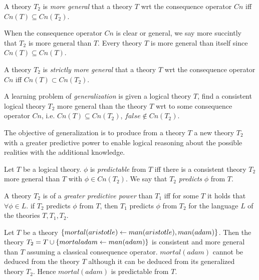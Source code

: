 \begin{defn}
A theory $T_2$ is \emph{more general} that a theory $T$ wrt the consequence operator $Cn$ iff $Cn(T) \subseteq Cn(T_2)$.
\end{defn}
When the consequence operator $Cn$ is clear or general, we say more succintly that $T_2$ is more general than $T$. Every theory $T$ is more general than itself since $Cn(T) \subseteq Cn(T)$.

\begin{defn}
A theory $T_2$ is \emph{strictly more general} that a theory $T$ wrt the consequence operator $Cn$ iff $Cn(T) \subset Cn(T_2)$.
\end{defn}

\begin{defn}
A learning problem of \emph{generalization} is given a logical theory $T$, find a consistent logical theory $T_2$ more general than the theory $T$ wrt to some consequence operator $Cn$, i.e.
$Cn(T) \subseteq Cn(T_2)$, $false \not\in Cn(T_2)$.
\end{defn}

The objective of generalization is to produce from a theory $T$ a new theory $T_2$ with a greater predictive power to enable logical reasoning about the possible realities with the additional knowledge.

\begin{defn}
Let $T$ be a logical theory. $\phi$ is \emph{predictable} from $T$ iff there is a consistent theory $T_2$ more general than $T$ with $\phi \in Cn(T_2)$. We say that $T_2$ \emph{predicts} $\phi$ from $T$.
\end{defn}

\begin{defn}
A theory $T_2$ is of a \emph{greater predictive power} than $T_1$ iff
for some $T$ it holds that $\forall \phi \in L.$ if $T_2$ predicts $\phi$ from $T$, then $T_1$ predicts $\phi$ from $T_2$ for the language $L$ of the theories $T, T_1, T_2$.
\end{defn}

\begin{exmp}
Let $T$ be a theory $\{mortal(aristotle) \leftarrow man(aristotle), man(adam)\}$. Then the theory $T_2=T \cup \{mortal{adam} \leftarrow man(adam)\}$ is consistent and more general than $T$ assuming a classical consequence operator. $mortal(adam)$ cannot be deduced from the theory $T$ although it can be deduced from its generalized theory $T_2$. Hence $mortal(adam)$ is predictable from $T$.
\end{exmp}

